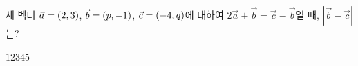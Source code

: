 세 벡터 $\vec{a}=(2{,}\mkern3mu\mathopen{}3)$, $\vec{b}=(p{,}\mkern3mu\mathopen{}-1)$, $\vec{c}=(-4{,}\mkern3mu\mathopen{}q)$에 대하여 $2\vec{a}+\vec{b}=\vec{c}-\vec{b}$일 때, $|\vec{b}-\vec{c}|$는?
\begin{choices32}{$1$}{$2$}{$3$}{$4$}{$5$}\end{choices32}
